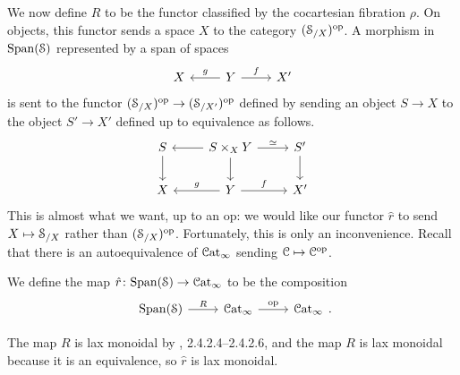 \documentclass[main.tex]{subfiles}
\begin{document}
We now define $R$ to be the functor classified by the cocartesian fibration $\rho$. On objects, this functor sends a space $X$ to the category $(\S_{/X})\op$. A morphism in $\Span(\S)$ represented by a span of spaces
\begin{equation*}
  \begin{tikzcd}
    X
    & Y
    \arrow[l, swap, "g"]
    \arrow[r, "f"]
    & X'
  \end{tikzcd}
\end{equation*}
is sent to the functor $(\S_{/X})\op \to (\S_{/X'})\op$ defined by sending an object $S \to X$ to the object $S' \to X'$ defined up to equivalence as follows.
\begin{equation*}
  \begin{tikzcd}
    S
    \arrow[d]
    & S \times_{X} Y
    \arrow[l]
    \arrow[r, "\simeq"]
    \arrow[d]
    & S'
    \arrow[d]
    \\
    X
    & Y
    \arrow[l, swap, "g"]
    \arrow[r, "f"]
    & X'
  \end{tikzcd}
\end{equation*}
This is almost what we want, up to an $\mathrm{op}$: we would like our functor $\hat{r}$ to send $X \mapsto \S_{/X}$ rather than $(\S_{/X})\op$. Fortunately, this is only an inconvenience. Recall that there is an autoequivalence of $\ICat$ sending $\category{C} \mapsto \category{C}\op$.
\begin{definition}
  We define the map $\hat{r}\colon \Span(\S) \to \ICat$ to be the composition
  \begin{equation*}
    \begin{tikzcd}
      \Span(\S)
      \arrow[r, "R"]
      & \ICat
      \arrow[r, "\mathrm{op}"]
      & \ICat
    \end{tikzcd}.
  \end{equation*}
\end{definition}

The map $R$ is lax monoidal by \cite{luriehigheralgebra}, 2.4.2.4--2.4.2.6, and the map $R$ is lax monoidal because it is an equivalence, so $\hat{r}$ is lax monoidal.
\end{document}
